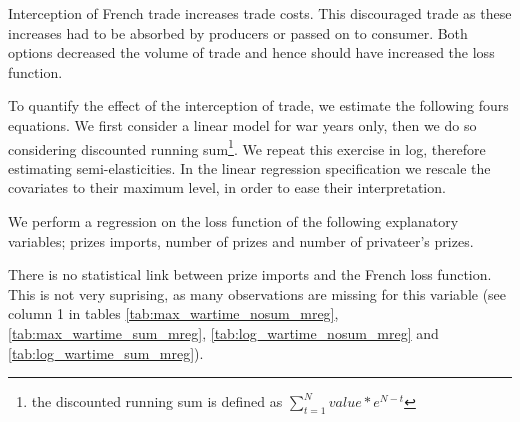 \documentclass[12pt,a4paper,notitlepage,english]{article}
\begin{document}
Interception of French trade increases trade costs.
This discouraged trade as these increases had to be absorbed by producers or passed on to consumer.
Both options decreased the volume of trade and hence should have increased the loss function.

To quantify the effect of the interception of trade, we estimate the following fours equations.
We first consider a linear model for war years only, then we do so considering discounted running sum\footnote{the discounted running sum is defined as $\sum_{t=1}^N value*e^{N-t}$}. We repeat this exercise in log, therefore estimating semi-elasticities. 
In the linear regression specification we rescale the covariates to their maximum level, in order to ease their interpretation. 


We perform a regression on the loss function of the following explanatory variables; prizes imports, number of prizes and number of privateer's prizes. 

There is no statistical link between prize imports and the French loss function. This is not very suprising, as many observations are missing for this variable (see column 1 in tables \ref{tab:max_wartime_nosum_mreg},  \ref{tab:max_wartime_sum_mreg}, \ref{tab:log_wartime_nosum_mreg} and   \ref{tab:log_wartime_sum_mreg}).



\end{document}
